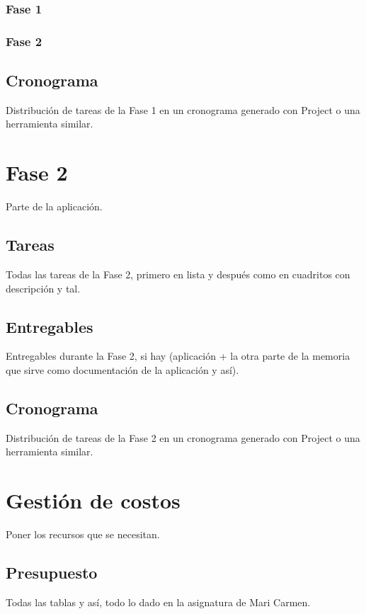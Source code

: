 \subsubsection{Fase 1}
\subsubsection{Fase 2}

\subsection{Cronograma}
{\color{red} Distribución de tareas de la Fase 1 en un cronograma generado con Project o una herramienta similar.}


\section{Fase 2}
{\color{red} Parte de la aplicación.}

\subsection{Tareas}
{\color{red} Todas las tareas de la Fase 2, primero en lista y después como en cuadritos con descripción y tal.}

\subsection{Entregables}
{\color{red} Entregables durante la Fase 2, si hay (aplicación + la otra parte de la memoria que sirve como documentación de la aplicación y así).}

\subsection{Cronograma}
{\color{red} Distribución de tareas de la Fase 2 en un cronograma generado con Project o una herramienta similar.}


\section{Gestión de costos}
{\color{red} Poner los recursos que se necesitan.}

\subsection{Presupuesto}
{\color{red} Todas las tablas y así, todo lo dado en la asignatura de Mari Carmen.}

